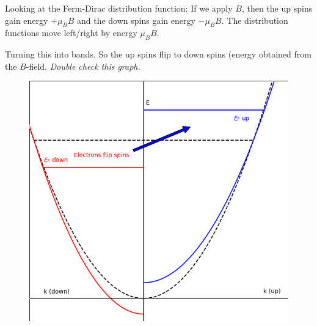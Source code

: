 \documentclass[a4paper, 11pt, normalem]{report}
\begin{document}
Looking at the Ferm-Dirac distribution function:
If we apply $B$, then the up spins gain energy $+\mu_BB$ and the down spins gain energy $-\mu_BB$.
The distribution functions move left/right by energy $\mu_BB$.

Turning this into bands.
So the up spins flip to down spins (energy obtained from the $B$-field.
\emph{Double check this graph.}
\begin{figure}[H]
    \centering
    \includegraphics[scale=0.4]{elbnds.png}
\end{figure}

\chapter{}
\end{document}
